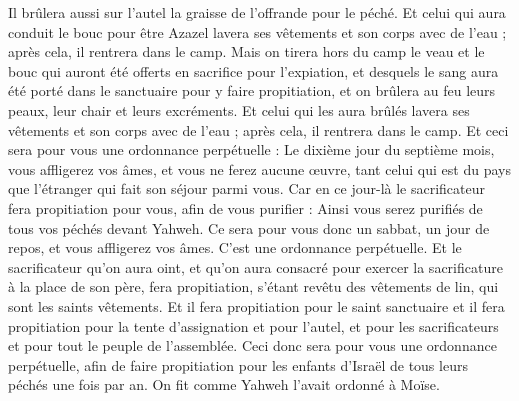 \begin{multicols}{2}
Il brûlera aussi sur l'autel la graisse de l'offrande pour le péché.
Et celui qui aura conduit le bouc pour être Azazel lavera ses vêtements et son corps avec de l'eau ; après cela, il rentrera dans le camp.
Mais on tirera hors du camp le veau et le bouc qui auront été offerts en sacrifice pour l'expiation, et desquels le sang aura été porté dans le sanctuaire pour y faire propitiation, et on brûlera au feu leurs peaux, leur chair et leurs excréments.
Et celui qui les aura brûlés lavera ses vêtements et son corps avec de l'eau ; après cela, il rentrera dans le camp.
Et ceci sera pour vous une ordonnance perpétuelle : Le dixième jour du septième mois, vous affligerez vos âmes, et vous ne ferez aucune œuvre, tant celui qui est du pays que l'étranger qui fait son séjour parmi vous.
Car en ce jour-là le sacrificateur fera propitiation pour vous, afin de vous purifier : Ainsi vous serez purifiés de tous vos péchés devant Yahweh.
Ce sera pour vous donc un sabbat, un jour de repos, et vous affligerez vos âmes. C'est une ordonnance perpétuelle.
Et le sacrificateur qu'on aura oint, et qu'on aura consacré pour exercer la sacrificature à la place de son père, fera propitiation, s'étant revêtu des vêtements de lin, qui sont les saints vêtements.
Et il fera propitiation pour le saint sanctuaire et il fera propitiation pour la tente d'assignation et pour l'autel, et pour les sacrificateurs et pour tout le peuple de l'assemblée.
Ceci donc sera pour vous une ordonnance perpétuelle, afin de faire propitiation pour les enfants d'Israël de tous leurs péchés une fois par an. On fit comme Yahweh l'avait ordonné à Moïse.

\end{multicols}
